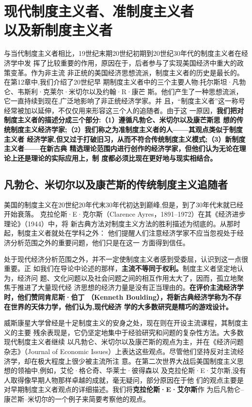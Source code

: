 \section{现代制度主义者、准制度主义者\\以及新制度主义者}

与当代制度主义者相比，19世纪末期20世纪初期到20世纪30年代的制度主义者在经济学中发
挥了比较重要的作用，原因在于，后者参与了实现美国经济中重大的政策变革。作为非主流
非正统的美国经济思想流派，制度主义者的历史是最长的。在第12章中,我们介绍了20世纪早
期制度主义者中的三个主要人物:托尔斯坦·凡勃仑、韦斯利·克莱尔·米切尔以及约翰·R·康芒
斯。他们产生了一种思想流派，它一直持续到现在,广泛地影响了非正统经济学家。并
且，“制度主义者”这一称号经常被加以延伸，不仅仅用来形容这三个人的追随者。由于这
一原因，\textbf{我们把对制度主义者的描述分成三个部分:（1）遵循凡勃仑、米切尔以及康芒斯思
想的传统制度主义经济学家;（2）我们称之为准制度主义者的人——其观点类似于制度主义者
经济学家,但又过于打破旧习，从而不符合传统制度主义模式;（3）新制度主义者——在新古典
精选理论范围内进行创作的经济学家，但他们认为无论在理论上还是理论的实际应用上，制
度都必须比现在更好地与现实相结合。}

\subsection{凡勃仑、米切尔以及康芒斯的传统制度主义追随者}

美国的制度主义在20世纪20年代末30年代初达到巅峰,但是，到了30年代末就已经开始衰落。
克拉伦斯·E·克尔斯（Clarence Ayres，1891--1972）在其《经济进步理论》（1944）中，将
新古典方法对制度主义方法的胜利描述为彻底的。从那时起，制度主义者就处在学科之外：
他们提醒人们注意经济学家不应当忽视处于经济分析范围之外的重要问题，他们只是在这一
方面得到信任。

处于现代经济分析范围之外，并不一定使制度主义者感到受委屈，认识到这一点很重要。正
如我们在导论中论述的那样，\textbf{主流不等同于权利。}制度主义者坚定地认为，经济问
题、文化问题以及社会问题之间的相互作用太大了，因而，孤立地聚焦于推进了大量现代经
济思想的经济力量是没有正当理由的。\textbf{在评价主流经济学时，他们赞同肯尼斯·伯丁
  （Kenneth Boulding），将新古典经济学称为不存在世界的天体力学，他们认为,现代经济
  学的大多数研究是精巧的游戏设计。}

威斯康星大学曾经是十足制度主义的安身之处，现在则在开设主流课程，其制度主义的主要
残余表现是，它仍坚定地集中于经验研究和问题的复杂性方法。大多数现代制度主义者继续
以凡勃仑、米切尔以及康芒斯的观点为主，并在《经济问题杂志》（Journal of Economic
Issues）上表达这些观点。尽管他们坚持反对主流经济学，却在极大程度上很少被主流所注
意。在第二次世界大战后美国制度主义思想的领袖中,例如，艾伦·格仑奇、华莱士·彼得森以
及克拉伦斯·E·艾尔斯,没有人取得像早期人物那样卓越的成就，毫无疑问，部分原因在于他
们的观点主要是对早期制度主义者观点的详细描述。我们将\textbf{克拉伦斯·E·艾尔斯}作
为后凡勃仑--康芒斯--米切尔的一个例子来简要考察他的观点。

